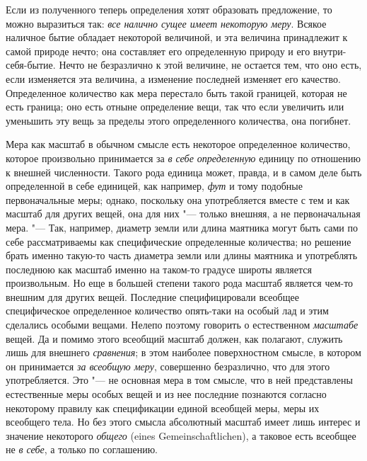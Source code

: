 Если из полученного теперь определения хотят образовать предложение, то
можно выразиться так: {\em все налично сущее имеет
некоторую меру}. Всякое наличное бытие обладает некоторой величиной, и эта
величина принадлежит к самой природе нечто; она составляет его определенную
природу и его внутри-себя-бытие. Нечто не безразлично к этой величине, не
остается тем, что оно есть, если изменяется эта величина, а изменение
последней изменяет его качество. Определенное количество как мера перестало
быть такой границей, которая не есть граница; оно есть отныне определение
вещи, так что если увеличить или уменьшить эту вещь за пределы этого
определенного количества, она погибнет.

Мера как масштаб в обычном смысле есть некоторое определенное количество,
которое произвольно принимается за {\em в себе
определенную} единицу по отношению к внешней численности. Такого рода
единица может, правда, и в самом деле быть определенной в себе единицей,
как например, {\em фут}
и тому подобные первоначальные меры; однако, поскольку она употребляется
вместе с тем и как масштаб для других вещей, она для них "--- только внешняя,
а не первоначальная мера. "--- Так, например, диаметр земли или длина маятника
могут быть сами по себе рассматриваемы как специфические определенные
количества; но решение брать именно такую-то часть диаметра земли или длины
маятника и употреблять последнюю как масштаб именно на таком-то градусе
широты является произвольным. Но еще в большей степени такого рода масштаб
является чем-то внешним для других вещей. Последние специфицировали
всеобщее специфическое определенное количество опять-таки на особый лад и
этим сделались особыми вещами. Нелепо поэтому говорить о естественном
{\em масштабе} вещей. Да и помимо этого всеобщий
масштаб должен, как полагают, служить лишь для внешнего
{\em сравнения}; в этом наиболее поверхностном смысле,
в котором он принимается {\em за всеобщую меру},
совершенно безразлично, что для этого употребляется. Это "--- не основная мера
в том смысле, что в ней представлены естественные меры особых вещей и из
нее последние познаются согласно некоторому правилу как спецификации единой
всеобщей меры, меры их всеобщего тела. Но без этого смысла абсолютный
масштаб имеет лишь интерес и значение некоторого
{\em общего} (eines Gemeinschaftlichen), а таковое есть
всеобщее не {\em в себе}, а только по соглашению.

